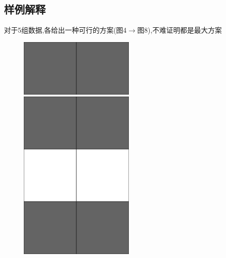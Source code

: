 \documentclass[12pt]{ctexart}
\begin{document}
	\subsection{样例解释}
	对于5组数据,各给出一种可行的方案(图4$\to$图8),不难证明都是最大方案

	\begin{figure}[htbp]
		\centering
		\begin{minipage}[t]{0.32\textwidth}
			\centering
			\includegraphics[width=0.5\textwidth]{pictures/2-1.png}
			\caption{}
		\end{minipage}
		\begin{minipage}[t]{0.32\textwidth}
			\centering
			\includegraphics[width=0.5\textwidth]{pictures/2-2.png}
			\caption{}
		\end{minipage}
		\begin{minipage}[t]{0.32\textwidth}
			\centering

\end{minipage}
\end{figure}
\end{document}
